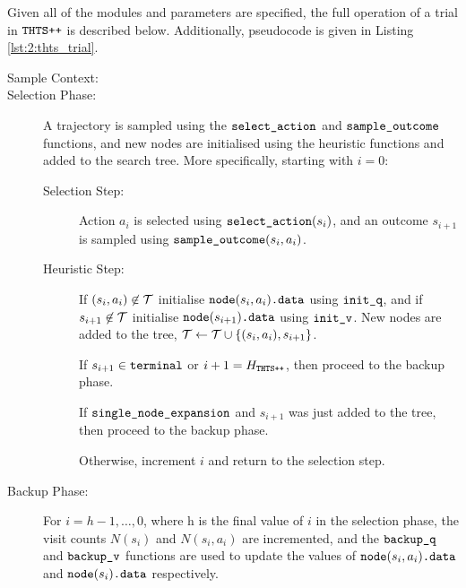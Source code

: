     Given all of the modules and parameters are specified, the full operation of a trial in ${\textnormal{\texttt{THTS++}}}$ is described below. Additionally, pseudocode is given in Listing \ref{lst:2:thts_trial}. 
    \begin{description}
        \item[Sample Context:] 
        \item[Selection Phase:] 
            A trajectory is sampled using the ${\textnormal{\texttt{select\_action}}}$ and ${\textnormal{\texttt{sample\_outcome}}}$ functions, and new nodes are initialised using the heuristic functions and added to the search tree. More specifically, starting with $i=0$: %
        \begin{description}
            \item[Selection Step:] 
                Action $a_i$ is selected using ${\textnormal{\texttt{select\_action}}}(s_i)$, and an outcome $s_{i+1}$ is sampled using ${\textnormal{\texttt{sample\_outcome}}}(s_i,a_i)$.
            \item[Heuristic Step:] 
                If $(s_i,a_i)\not\in\mathcal{T}$ initialise ${{\textnormal{\texttt{node}}}(s_i,a_i)\textnormal{\texttt{.data}}}$ using ${\textnormal{\texttt{init\_q}}}$, and if $s_{i+1}\not\in\mathcal{T}$ initialise ${{\textnormal{\texttt{node}}}(s_{i+1})\textnormal{\texttt{.data}}}$ using ${\textnormal{\texttt{init\_v}}}$. New nodes are added to the tree, $\mathcal{T}\leftarrow\mathcal{T}\cup\{(s_i,a_i),s_{i+1}\}$.
            \item[] 
                If $s_{i+1}\in{\textnormal{\texttt{terminal}}}$ or $i+1=H_{{\textnormal{\texttt{THTS++}}}}$, then proceed to the backup phase.
            \item[] 
                If ${\textnormal{\texttt{single\_node\_expansion}}}$ and $s_{i+1}$ was just added to the tree, then proceed to the backup phase.
            \item[] 
                Otherwise, increment $i$ and return to the selection step.
        \end{description}
        \item[Backup Phase:]
            For $i=h-1,\ldots,0$, where h is the final value of $i$ in the selection phase, the visit counts $N(s_i)$ and $N(s_i,a_i)$ are incremented, and the ${\textnormal{\texttt{backup\_q}}}$ and ${\textnormal{\texttt{backup\_v}}}$ functions are used to update the values of ${{\textnormal{\texttt{node}}}(s_i,a_i)\textnormal{\texttt{.data}}}$ and ${{\textnormal{\texttt{node}}}(s_i)\textnormal{\texttt{.data}}}$ respectively.
    \end{description}
            
